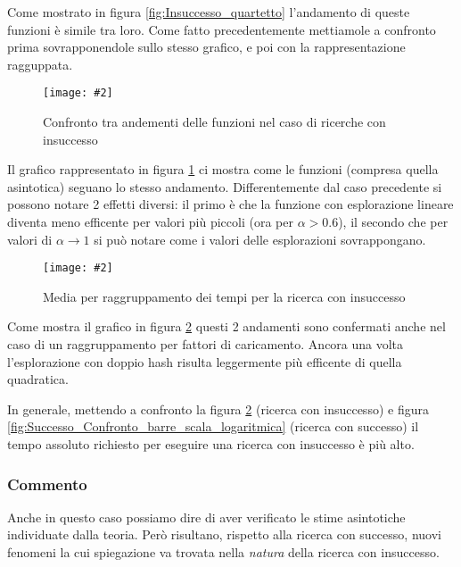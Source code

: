\documentclass{article}
\newcommand{\image}[3][1]{
	\centering
	\texttt{[image: \#2]}
	\caption{#3}
}
\begin{document}
Come mostrato in figura \ref{fig:Insuccesso_quartetto} l'andamento di queste funzioni è simile tra loro. Come fatto precedentemente mettiamole a confronto prima sovrapponendole sullo stesso grafico, e poi con la rappresentazione ragguppata.  

\begin{figure}[H]
\image[0.75]{Insuccesso_Confronto_Asintotico_scala_logaritmica}{Confronto tra andementi delle funzioni nel caso di ricerche con insuccesso}
\label{fig:Insuccesso_Confronto_Asintotico_scala_logaritmica}
\end{figure}

Il grafico rappresentato in figura \ref{fig:Insuccesso_Confronto_Asintotico_scala_logaritmica} ci mostra come le funzioni (compresa quella asintotica) seguano lo stesso andamento. Differentemente dal caso precedente si possono notare 2 effetti diversi: il primo è che la funzione con esplorazione lineare diventa meno efficente per valori più piccoli (ora per $\alpha > 0.6$), il secondo che per valori di $\alpha \longrightarrow 1$ si può notare come i valori delle esplorazioni sovrappongano.

\begin{figure}[H]
\image[0.75]{Insuccesso_Confronto_barre_scala_logaritmica}{Media per raggruppamento dei tempi per la ricerca con insuccesso}
\label{fig:Insuccesso_Confronto_barre_scala_logaritmica}
\end{figure}

Come mostra il grafico in figura \ref{fig:Insuccesso_Confronto_barre_scala_logaritmica} questi 2 andamenti sono confermati anche nel caso di un raggruppamento per fattori di caricamento. Ancora una volta l'esplorazione con doppio hash risulta leggermente più efficente di quella quadratica.

In generale, mettendo a confronto la figura \ref{fig:Insuccesso_Confronto_barre_scala_logaritmica} (ricerca con insuccesso) e figura \ref{fig:Successo_Confronto_barre_scala_logaritmica} (ricerca con successo) il tempo assoluto richiesto per eseguire una ricerca con insuccesso è più alto.

\subsubsection{Commento}
Anche in questo caso possiamo dire di aver verificato le stime asintotiche individuate dalla teoria. Però risultano, rispetto alla ricerca con successo, nuovi fenomeni la cui spiegazione va trovata nella \emph{natura} della ricerca con insuccesso.
\end{document}
